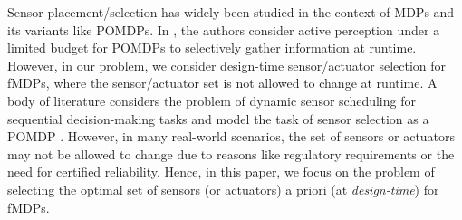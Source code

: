 \documentclass[twocolumn]{autart}    %
\begin{document}
 Sensor placement/selection has widely been studied in the context of MDPs and its variants like POMDPs. In \cite{ghasemi2019online}, the authors consider active perception under a limited budget for POMDPs to selectively gather information at runtime. However, in our problem, we consider design-time sensor/actuator selection for fMDPs, where the sensor/actuator set is not allowed to change at runtime. A body of literature considers the problem of dynamic sensor scheduling for sequential decision-making tasks and model the task of sensor selection as a POMDP \cite{krishnamurthy2007structured,ji2007nonmyopic}. However, in many real-world scenarios, the set of sensors or actuators may not be allowed to change due to reasons like regulatory requirements or the need for certified reliability.  Hence, in this paper, we focus on the problem of selecting the optimal set of sensors (or actuators) a priori (at \textit{design-time}) for fMDPs.

\end{document}
